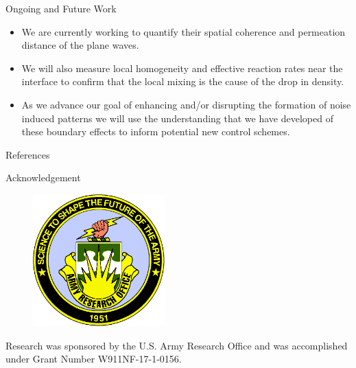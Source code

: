 \documentclass{beamer}
\begin{document}
\begin{frame}{}
\begin{textblock}{0.32}
    \begin{block}{\centering Ongoing and Future Work}
        \begin{itemize}
            \item We are currently working to quantify their spatial coherence 
                  and permeation distance of the plane waves.
            \item We will also measure local homogeneity and effective reaction 
                  rates near the interface to confirm that the local mixing
                  is the cause of the drop in density.
            \item As we advance our goal of enhancing and/or disrupting the formation
                  of noise induced patterns we will use the understanding that we
                  have developed of these boundary effects to inform potential
                  new control schemes.
        \end{itemize}
    \end{block}

    \begin{block}{\centering References}
        
        
    \end{block}

    \begin{block}{\centering Acknowledgement}
        \begin{figure}[h]
            \centering
            \includegraphics[width=2in]{images/aro_logo_t.png}
            \label{fig:aro_logo}
        \end{figure}
        \centering
        Research was sponsored by the U.S. Army Research Office and was accomplished 
        under Grant Number W911NF-17-1-0156. 
    \end{block}
    ~
    \vfill

\end{textblock}
\end{frame}
\end{document}
